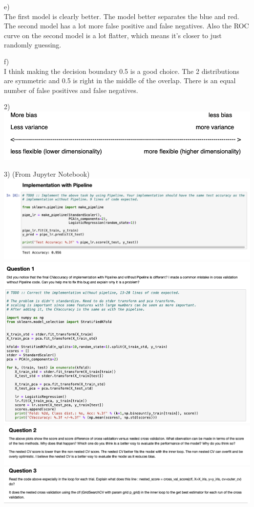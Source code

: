 \documentclass[11pt]{article}
\begin{document}
e) \\ 
The first model is clearly better. The model better separates the blue and red. The second model has a lot more false positive and false negatives. Also the ROC curve on the second model is a lot flatter, which means it's closer to just randomly guessing. 

f) \\
I think making the decision boundary 0.5 is a good choice. The 2 distributions are symmetric and 0.5 is right in the middle of the overlap. There is an equal number of false positives and false negatives.

2) \\
\includegraphics[scale=0.45]{img3}

3) (From Jupyter Notebook) \\
\includegraphics[scale=0.4]{code1} \\

\includegraphics[scale=0.4]{code2} \\

\includegraphics[scale=0.4]{code3} \\

\includegraphics[scale=0.4]{code4} \\
\end{document}
